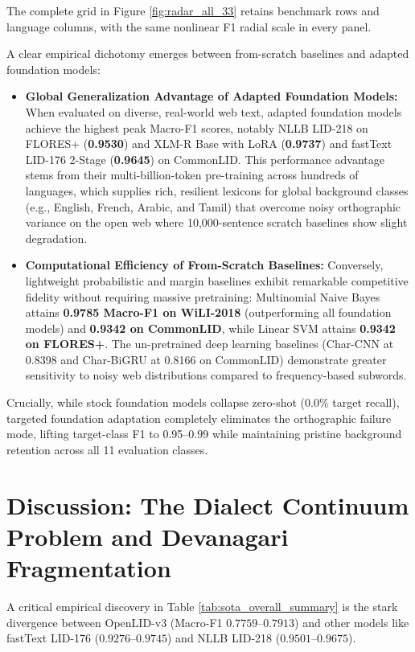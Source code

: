 \documentclass[11pt]{article}
\begin{document}
The complete grid in Figure \ref{fig:radar_all_33} retains benchmark rows and language columns, with the same nonlinear F1 radial scale in every panel.

A clear empirical dichotomy emerges between from-scratch baselines and adapted foundation models:
\begin{itemize}
    \item \textbf{Global Generalization Advantage of Adapted Foundation Models:} When evaluated on diverse, real-world web text, adapted foundation models achieve the highest peak Macro-F1 scores, notably NLLB LID-218 on FLORES+ (\textbf{0.9530}) and XLM-R Base with LoRA (\textbf{0.9737}) and fastText LID-176 2-Stage (\textbf{0.9645}) on CommonLID. This performance advantage stems from their multi-billion-token pre-training across hundreds of languages, which supplies rich, resilient lexicons for global background classes (e.g., English, French, Arabic, and Tamil) that overcome noisy orthographic variance on the open web where 10,000-sentence scratch baselines show slight degradation.
    \item \textbf{Computational Efficiency of From-Scratch Baselines:} Conversely, lightweight probabilistic and margin baselines exhibit remarkable competitive fidelity without requiring massive pretraining: Multinomial Naive Bayes attains \textbf{0.9785 Macro-F1 on WiLI-2018} (outperforming all foundation models) and \textbf{0.9342 on CommonLID}, while Linear SVM attains \textbf{0.9342 on FLORES+}. The un-pretrained deep learning baselines (Char-CNN at 0.8398 and Char-BiGRU at 0.8166 on CommonLID) demonstrate greater sensitivity to noisy web distributions compared to frequency-based subwords.
\end{itemize}

Crucially, while stock foundation models collapse zero-shot ($0.0\%$ target recall), targeted foundation adaptation completely eliminates the orthographic failure mode, lifting target-class F1 to 0.95--0.99 while maintaining pristine background retention across all 11 evaluation classes.

\FloatBarrier
\section{Discussion: The Dialect Continuum Problem and Devanagari Fragmentation}

A critical empirical discovery in Table \ref{tab:sota_overall_summary} is the stark divergence between OpenLID-v3 (Macro-F1 $0.7759$--$0.7913$) and other models like fastText LID-176 ($0.9276$--$0.9745$) and NLLB LID-218 ($0.9501$--$0.9675$).
\end{document}
